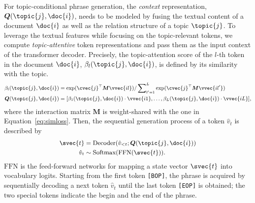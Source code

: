 For topic-conditional phrase generation, the \textit{context} representation, $\bm{Q}(\topic{j}, \doc{i})$, needs to be modeled by fusing the textual content of a document $\doc{i}$ as well as the relation structure of a topic $\topic{j}$.
To leverage the textual features while focusing on the topic-relevant tokens, we compute \textit{topic-attentive} token representations and pass them as the input context of the transformer decoder.
Precisely, the topic-attention score of the $l$-th token in the document $\doc{i}$, $\beta_l(\topic{j},\doc{i})$, is defined by its similarity with the topic.
\vspace{-15pt}
\begin{equation}
\small
\label{eq:gencontext}
    \begin{split}
       \beta_l(\topic{j},\doc{i}) &= {\exp(\cvec{j}^\top\bm{M}\vvec{il})}/{\sideset{}{_{l'=1}^L}\sum\exp(\cvec{j}^\top\bm{M}\vvec{il'})} \\
        \bm{Q}(\topic{j},\doc{i}) &= [\beta_1(\topic{j},\doc{i}) \cdot \vvec{i1}, \ldots, \beta_{L}(\topic{j},\doc{i}) \cdot \vvec{iL}],
    \end{split}
\end{equation}
where the interaction matrix $\bm{M}$ is weight-shared with the one in Equation~\eqref{eq:simloss}.
Then, the sequential generation process of a token $\hat{v}_t$ is described by
\begin{equation}
\small
\label{eq:genoutput}
\begin{split}
    \svec{t} &= \text{Decoder}(\hat{v}_{<t};\bm{Q}(\topic{j},\doc{i})) \\ 
    \hat{v}_{t} &\sim \text{Softmax}(\text{FFN}(\svec{t})).
\end{split}
\end{equation}
$\text{FFN}$ is the feed-forward networks for mapping a state vector $\svec{t}$ into vocabulary logits.
Starting from the first token \texttt{[BOP]}, the phrase is acquired by sequentially decoding a next token $\hat{v}_t$ until the last token \texttt{[EOP]} is obtained;
the two special tokens indicate the begin and the end of the phrase.


